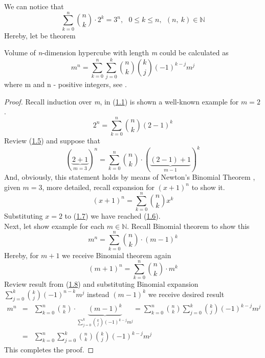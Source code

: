 We can notice that
\begin{equation}
    \label{hyp2}
    \sum_{k=0}^{n}\binom{n}{k}\cdot 2^k=3^n, \ \ \ 0\leq k\leq n, \ \ (n, \ k)\in\mathbb{N}
\end{equation}
Hereby, let be theorem
\begin{thm}
    Volume of \textit{n}-dimension hypercube with length \textit{m} could be calculated as
    \begin{equation}
        \label{hyp3}
        m^n=\sum_{k=0}^{n}\sum_{j=0}^{k}\binom{n}{k}\binom{k}{j}(-1)^{k-j}m^j
    \end{equation}
    where m and n - positive integers, see \cite{10}.
    \begin{proof}
        Recall induction over \textit{m}, in (\hyperref[hyp1]{1.1}) is shown a well-known example for $m=2$.
        \begin{equation}
            \label{d1}
            2^n=\sum_{k=0}^{n}\binom{n}{k}(2-1)^k
        \end{equation}
        Review (\hyperref[d1]{1.5}) and suppose that
        \begin{equation}
            \label{hyp4}
            (\underbrace{2+1}_{m=3})^n=\sum_{k=0}^{n}\binom{n}{k}\cdot (\underbrace{(2-1)+1}_{m-1})^k
        \end{equation}
        And, obviously, this statement holds by means of Newton's Binomial Theorem \cite{2}, \cite{4} given $m=3$, more detailed, recall expansion for $(x+1)^n$ to show it.
        \begin{equation}
            \label{d2}
            (x+1)^n=\sum_{k=0}^{n}\binom{n}{k}x^k
        \end{equation}
        Substituting $x=2$ to (\hyperref[d2]{1.7}) we have reached (\hyperref[hyp4]{1.6}).\\
        Next, let show example for each $m\in\mathbb{N}$. Recall Binomial theorem to show this
        \begin{equation}
            \label{hyp5}
            m^n=\sum_{k=0}^{n}\binom{n}{k}\cdot (m-1)^k
        \end{equation}
        Hereby, for $m+1$ we receive Binomial theorem again
        \begin{equation}
            \label{hyp6}
            (m+1)^n=\sum_{k=0}^{n}\binom{n}{k}\cdot m^k
        \end{equation}
        Review result from (\hyperref[hyp5]{1.8}) and substituting Binomial expansion $\sum_{j=0}^{k}\binom{k}{j}(-1)^{n-k}m^j$ instead $(m-1)^k$ we receive desired result
        \begin{eqnarray}
            \label{hyp8}
            m^n &=& \sum_{k=0}^{n}\binom{n}{k}\cdot \underbrace{(m-1)^k}_{\sum_{j=0}^{k}\binom{k}{j}(-1)^{k-j}m^j}=\sum_{k=0}^{n}\binom{n}{k}\sum_{j=0}^{k}\binom{k}{j}(-1)^{k-j}m^j\\
            &=& \sum_{k=0}^{n}\sum_{j=0}^{k}\binom{n}{k}\binom{k}{j}(-1)^{k-j}m^j \nonumber
        \end{eqnarray}
        This completes the proof.
    \end{proof}
\end{thm}
